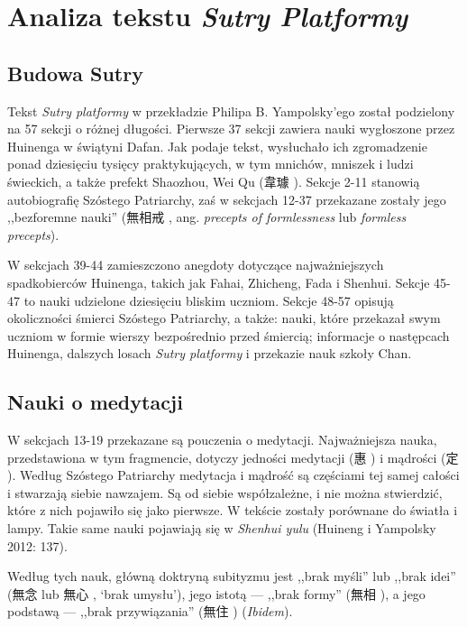 \chapter{Analiza tekstu \textit{Sutry Platformy}}

\section{Budowa Sutry}
Tekst \textit{Sutry platformy} w przekładzie Philipa B. Yampolsky'ego został podzielony na 57 sekcji o różnej długości. Pierwsze 37 sekcji zawiera nauki wygłoszone przez Huinenga w świątyni Dafan. Jak podaje tekst, wysłuchało ich zgromadzenie ponad dziesięciu tysięcy praktykujących, w tym mnichów, mniszek i ludzi świeckich, a także prefekt Shaozhou, Wei Qu (韋璩 ). Sekcje 2-11 stanowią autobiografię Szóstego Patriarchy, zaś w sekcjach 12-37 przekazane zostały jego ,,bezforemne nauki'' (無相戒 , ang. \textit{precepts of formlessness} lub \textit{formless precepts}).

W sekcjach 39-44 zamieszczono anegdoty dotyczące najważniejszych spadkobierców Huinenga, takich jak Fahai, Zhicheng, Fada i Shenhui. Sekcje 45-47 to nauki udzielone dziesięciu bliskim uczniom. Sekcje 48-57 opisują okoliczności śmierci Szóstego Patriarchy, a także: nauki, które przekazał swym uczniom w formie wierszy bezpośrednio przed śmiercią; informacje o następcach Huinenga, dalszych losach \textit{Sutry platformy} i przekazie nauk szkoły Chan.

\section{Nauki o medytacji}
W sekcjach 13-19 przekazane są pouczenia o medytacji. Najważniejsza nauka, przedstawiona w tym fragmencie, dotyczy jedności medytacji (惠 ) i mądrości (定 ). Według Szóstego Patriarchy medytacja i mądrość są częściami tej samej całości i stwarzają siebie nawzajem. Są od siebie współzależne, i nie można stwierdzić, które z nich pojawiło się jako pierwsze. W tekście zostały porównane do światła i lampy. Takie same nauki pojawiają się w \textit{Shenhui yulu} (Huineng i Yampolsky 2012: 137).

Według tych nauk, główną doktryną subityzmu jest ,,brak myśli'' lub ,,brak idei'' (無念  lub 無心 , `brak umysłu'), jego istotą --- ,,brak formy'' (無相 ), a jego podstawą --- ,,brak przywiązania'' (無住 ) (\textit{Ibidem}).

